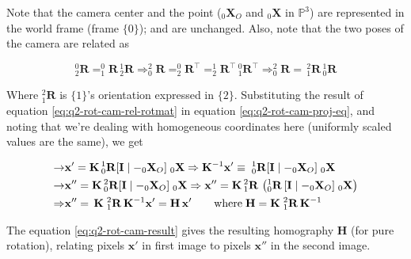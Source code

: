 Note that the camera center and the point ($_0\mathbf{X}_O$ and $_0\mathbf{X}$ in $\mathbb{P}^3$) are represented in the world frame (frame $\{0\}$); and are unchanged.
Also, note that the two poses of the camera are related as

\begin{equation}
    ^0_2\mathbf{R} = ^0_1\mathbf{R} \, ^1_2\mathbf{R}
    \Rightarrow ^2_0\mathbf{R} = ^0_2\mathbf{R}^\top = ^1_2\mathbf{R}^\top \, ^0_1\mathbf{R}^\top 
    \Rightarrow ^2_0\mathbf{R} = \, ^2_1\mathbf{R} \, ^1_0\mathbf{R}
    \label{eq:q2-rot-cam-rel-rotmat}
\end{equation}

Where $^2_1\mathbf{R}$ is $\{1\}$'s orientation expressed in $\{2\}$. Substituting the result of equation \ref{eq:q2-rot-cam-rel-rotmat} in equation \ref{eq:q2-rot-cam-proj-eq}, and noting that we're dealing with homogeneous coordinates here (uniformly scaled values are the same), we get

\begin{align}
    \rightarrow& \mathbf{x}' = \mathbf{K} \, ^1_0\mathbf{R} [ \mathbf{I} \mid - _0\mathbf{X}_O ] \; _0\mathbf{X}
    \Rightarrow \mathbf{K}^{-1} \mathbf{x}' \equiv \; ^1_0\mathbf{R} [ \mathbf{I} \mid - _0\mathbf{X}_O ] \; _0\mathbf{X}
    \nonumber \\
    \rightarrow& \mathbf{x}'' = \mathbf{K} \, ^2_0\mathbf{R} [ \mathbf{I} \mid - _0\mathbf{X}_O ] \; _0\mathbf{X}
    \Rightarrow \mathbf{x}'' = \mathbf{K} \, ^2_1\mathbf{R} \, \left ( ^1_0\mathbf{R} \, [ \mathbf{I} \mid - _0\mathbf{X}_O ] \; _0\mathbf{X} \right )
    \nonumber \\
    \Rightarrow& \mathbf{x}'' = \, \mathbf{K} \; ^2_1\mathbf{R} \, \mathbf{K}^{-1} \mathbf{x}' = \mathbf{H} \, \mathbf{x}'
    \qquad \textup{where} \; \mathbf{H} = \mathbf{K} \; ^2_1\mathbf{R} \, \mathbf{K}^{-1}
    \label{eq:q2-rot-cam-result}
\end{align}

The equation \ref{eq:q2-rot-cam-result} gives the resulting homography $\mathbf{H}$ (for pure rotation), relating pixels $\mathbf{x}'$ in first image to pixels $\mathbf{x}''$ in the second image.
